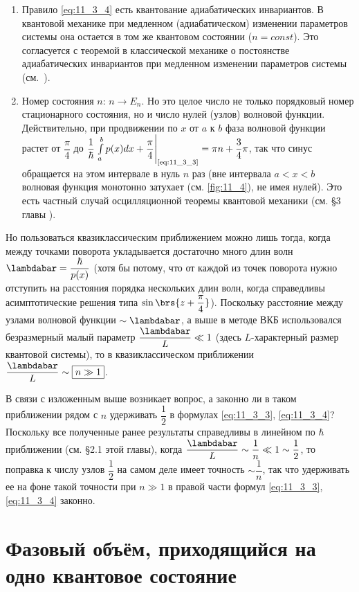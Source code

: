 \begin{enumerate}
\item Правило \eqref{eq:11_3_4} есть квантование адиабатических инвариантов. В квантовой механике при медленном (адиабатическом) изменении параметров системы она остается в том же квантовом состоянии ($n = const$). Это согласуется с теоремой в классической механике о постоянстве адиабатических инвариантов при медленном изменении параметров системы (см.~).

\item Номер состояния $n$: $n \to E_n$. Но это целое число не только порядковый номер стационарного состояния, но и число нулей (узлов) волновой функции. Действительно, при продвижении по $x$ от $a$ к $b$ фаза волновой функции растет от $\dfrac{\pi}{4}$ до $\dfrac{1}{\hbar} \left. \int \limits_{a}^{b} p(x)dx + \dfrac{\pi}{4} \right|_{\text{\eqref{eq:11_3_3}}} =\pi n + \dfrac{3}{4}\pi$, так что синус обращается на этом интервале в нуль $n$ раз (вне интервала $a < x < b$ волновая функция монотонно затухает (см. \autoref{fig:11_4}), не имея нулей). Это есть частный случай осцилляционной теоремы квантовой механики (см. \S 3 главы ).
\end{enumerate}

Но пользоваться квазиклассическим приближением можно лишь тогда, когда между точками поворота укладывается достаточно много длин волн $\lambdabar = \dfrac{\hbar}{p(x)}$ (хотя бы потому, что от каждой из точек поворота нужно отступить на расстояния порядка нескольких длин волн, когда справедливы асимптотические решения типа $\sin \brs{z + \dfrac{\pi}{4}}$). Поскольку расстояние между узлами волновой функции $\sim \lambdabar$, а выше в методе ВКБ использовался безразмерный малый параметр $\dfrac{\lambdabar}{L} \ll 1$ (здесь $L$-характерный размер квантовой системы), то в квазиклассическом приближении $\dfrac{\lambdabar}{L} \sim \boxed{n \gg 1}$.

В связи с изложенным выше возникает вопрос, а законно ли в таком приближении рядом с $n$ удерживать $\dfrac{1}{2}$ в формулах \eqref{eq:11_3_3}, \eqref{eq:11_3_4}? Поскольку все полученные ранее результаты справедливы в линейном по $\hbar$ приближении (см. \S {2.1} этой главы), когда $\dfrac{\lambdabar}{L} \sim \dfrac{1}{n} \ll 1 \sim \dfrac{1}{2}$, то поправка к числу узлов $\dfrac{1}{2}$ на самом деле имеет точность $\sim \dfrac{1}{n}$, так что удерживать ее на фоне такой точности при $n \gg 1$ в правой части формул \eqref{eq:11_3_3}, \eqref{eq:11_3_4} законно.

\section{Фазовый объём, приходящийся на одно квантовое состояние}

